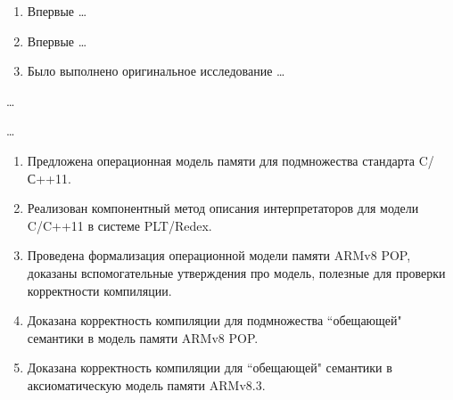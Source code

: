 {\novelty}
\begin{enumerate}
  \item Впервые \ldots
  \item Впервые \ldots
  \item Было выполнено оригинальное исследование \ldots
\end{enumerate}

{\influence} \ldots

{\methods} \ldots

{}
\begin{enumerate}
  \item Предложена операционная модель памяти для подмножества стандарта C/С++11.
  \item Реализован компонентный метод описания интерпретаторов для модели C/C++11 в системе PLT/Redex.
  \item Проведена формализация операционной модели памяти ARMv8 POP, доказаны вспомогательные утверждения про
        модель, полезные для проверки корректности компиляции.
  \item Доказана корректность компиляции для подмножества ``обещающей" \; семантики в модель памяти ARMv8 POP.
  \item Доказана корректность компиляции для ``обещающей" \; семантики в аксиоматическую модель памяти ARMv8.3.
\end{enumerate}

